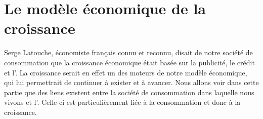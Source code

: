 \section{Le modèle économique de la croissance}

Serge Latouche, économiste français connu et reconnu, disait de notre société de consommation que la croissance économique était basée sur la publicité, le crédit et l'\op. La croissance serait en effet un des moteurs de notre modèle économique, qui lui permettrait de continuer à exister et à avancer. Nous allons voir dans cette partie que des liens existent entre la société de consommation dans laquelle nous vivons et l'\op. Celle-ci est particulièrement liée à la consommation et donc à la croissance.